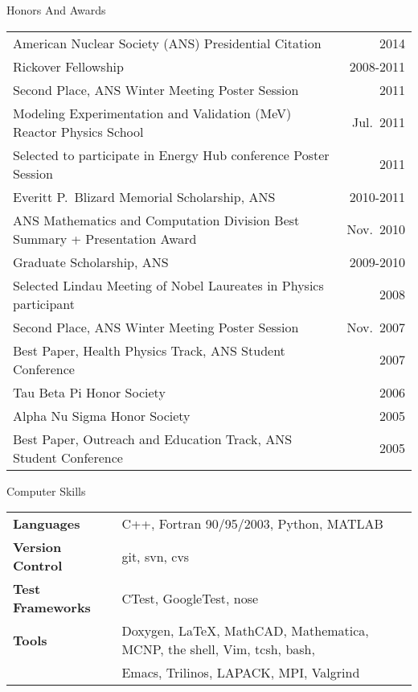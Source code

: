 \documentclass{resume2} %
\begin{document}
\begin{rSection}{Honors And Awards}

\begin{tabular}{ @{} l @{\hspace{6ex}} r }
American Nuclear Society (ANS) Presidential Citation & 2014 \\
Rickover Fellowship 	& 2008-2011 \\
Second Place, ANS Winter Meeting Poster Session	&2011\\
Modeling Experimentation and Validation (MeV) Reactor Physics School	& Jul.\ 2011\\
Selected to participate in Energy Hub conference Poster Session	&2011\\
Everitt P.\ Blizard Memorial Scholarship, ANS	&2010-2011\\
ANS Mathematics and Computation Division Best Summary + Presentation Award  &Nov.\ 2010\\
Graduate Scholarship, ANS 	&2009-2010\\
Selected Lindau Meeting of Nobel Laureates in Physics participant &	2008\\
Second Place, ANS Winter Meeting Poster Session	&Nov.\ 2007\\
Best Paper, Health Physics Track, ANS Student Conference 	&2007\\
Tau Beta Pi Honor Society	&2006\\
Alpha Nu Sigma Honor Society 	&2005 \\
Best Paper, Outreach and Education Track, ANS Student Conference	&2005
\end{tabular}

\end{rSection}


\begin{rSection}{Computer Skills}

\begin{tabular}{ @{} >{\bfseries}l @{\hspace{6ex}} l }
Languages & C++, Fortran 90/95/2003, Python, MATLAB \\
Version Control & git, svn, cvs \\
Test Frameworks & CTest, GoogleTest, nose \\
Tools & Doxygen, \LaTeX, MathCAD, Mathematica, MCNP, the shell, Vim, tcsh, bash, \\&Emacs, Trilinos, LAPACK, MPI, Valgrind
\end{tabular}

\end{rSection}
\end{document}
